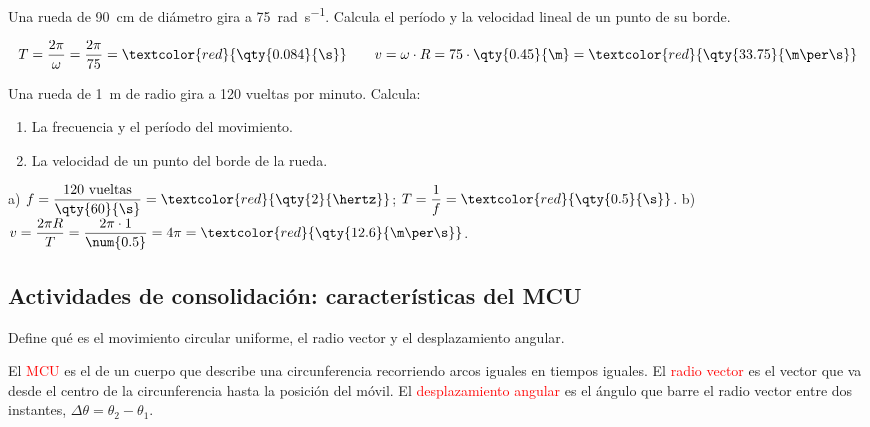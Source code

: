 \begin{exercise}
    Una rueda de \qty{90}{\cm} de diámetro gira a \qty{75}{\radian\per\s}. Calcula el período y la velocidad lineal de un punto de su borde.
    \begin{solu}
        \[ T = \frac{2\pi}{\omega} = \frac{2\pi}{75} = \textcolor{red}{\qty{0.084}{\s}} \qquad v = \omega \cdot R = 75 \cdot \qty{0.45}{\m} = \textcolor{red}{\qty{33.75}{\m\per\s}} \]
    \end{solu}
\end{exercise}

\begin{exercise}
    Una rueda de \qty{1}{\m} de radio gira a 120 vueltas por minuto. Calcula:
    \begin{enumerate}[label=\alph*)]
        \item La frecuencia y el período del movimiento.
        \item La velocidad de un punto del borde de la rueda.
    \end{enumerate}
    \begin{solu}
        a) \(f = \dfrac{120~\text{vueltas}}{\qty{60}{\s}} = \textcolor{red}{\qty{2}{\hertz}}\); \(T = \dfrac{1}{f} = \textcolor{red}{\qty{0.5}{\s}}\).
        b) \(v = \dfrac{2\pi R}{T} = \dfrac{2\pi \cdot 1}{\num{0.5}} = 4\pi = \textcolor{red}{\qty{12.6}{\m\per\s}}\).
    \end{solu}
\end{exercise}

\subsection*{Actividades de consolidación: características del MCU}

\begin{exercise}
    Define qué es el movimiento circular uniforme, el radio vector y el desplazamiento angular.
    \begin{solu}
        El \textcolor{red}{MCU} es el de un cuerpo que describe una circunferencia recorriendo arcos iguales en tiempos iguales. El \textcolor{red}{radio vector} es el vector que va desde el centro de la circunferencia hasta la posición del móvil. El \textcolor{red}{desplazamiento angular} es el ángulo que barre el radio vector entre dos instantes, \(\Delta\theta = \theta_2 - \theta_1\).
    \end{solu}
\end{exercise}

